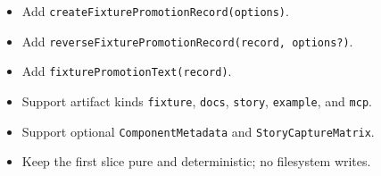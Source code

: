 \begin{itemize}
\tightlist
\item
  Add \texttt{c\allowbreak{}r\allowbreak{}e\allowbreak{}a\allowbreak{}t\allowbreak{}e\allowbreak{}F\allowbreak{}i\allowbreak{}x\allowbreak{}t\allowbreak{}u\allowbreak{}r\allowbreak{}e\allowbreak{}P\allowbreak{}r\allowbreak{}o\allowbreak{}m\allowbreak{}o\allowbreak{}t\allowbreak{}i\allowbreak{}o\allowbreak{}n\allowbreak{}R\allowbreak{}e\allowbreak{}c\allowbreak{}o\allowbreak{}r\allowbreak{}d\allowbreak{}(\allowbreak{}o\allowbreak{}p\allowbreak{}t\allowbreak{}i\allowbreak{}o\allowbreak{}n\allowbreak{}s\allowbreak{})}.
\item
  Add \texttt{r\allowbreak{}e\allowbreak{}v\allowbreak{}e\allowbreak{}r\allowbreak{}s\allowbreak{}e\allowbreak{}F\allowbreak{}i\allowbreak{}x\allowbreak{}t\allowbreak{}u\allowbreak{}r\allowbreak{}e\allowbreak{}P\allowbreak{}r\allowbreak{}o\allowbreak{}m\allowbreak{}o\allowbreak{}t\allowbreak{}i\allowbreak{}o\allowbreak{}n\allowbreak{}R\allowbreak{}e\allowbreak{}c\allowbreak{}o\allowbreak{}r\allowbreak{}d\allowbreak{}(\allowbreak{}r\allowbreak{}e\allowbreak{}c\allowbreak{}o\allowbreak{}r\allowbreak{}d\allowbreak{},\allowbreak{} \allowbreak{}o\allowbreak{}p\allowbreak{}t\allowbreak{}i\allowbreak{}o\allowbreak{}n\allowbreak{}s\allowbreak{}?\allowbreak{})}.
\item
  Add \texttt{f\allowbreak{}i\allowbreak{}x\allowbreak{}t\allowbreak{}u\allowbreak{}r\allowbreak{}e\allowbreak{}P\allowbreak{}r\allowbreak{}o\allowbreak{}m\allowbreak{}o\allowbreak{}t\allowbreak{}i\allowbreak{}o\allowbreak{}n\allowbreak{}T\allowbreak{}e\allowbreak{}x\allowbreak{}t\allowbreak{}(\allowbreak{}r\allowbreak{}e\allowbreak{}c\allowbreak{}o\allowbreak{}r\allowbreak{}d\allowbreak{})}.
\item
  Support artifact kinds \texttt{f\allowbreak{}i\allowbreak{}x\allowbreak{}t\allowbreak{}u\allowbreak{}r\allowbreak{}e}, \texttt{d\allowbreak{}o\allowbreak{}c\allowbreak{}s}, \texttt{s\allowbreak{}t\allowbreak{}o\allowbreak{}r\allowbreak{}y}, \texttt{e\allowbreak{}x\allowbreak{}a\allowbreak{}m\allowbreak{}p\allowbreak{}l\allowbreak{}e}, and \texttt{m\allowbreak{}c\allowbreak{}p}.
\item
  Support optional \texttt{C\allowbreak{}o\allowbreak{}m\allowbreak{}p\allowbreak{}o\allowbreak{}n\allowbreak{}e\allowbreak{}n\allowbreak{}t\allowbreak{}M\allowbreak{}e\allowbreak{}t\allowbreak{}a\allowbreak{}d\allowbreak{}a\allowbreak{}t\allowbreak{}a} and \texttt{S\allowbreak{}t\allowbreak{}o\allowbreak{}r\allowbreak{}y\allowbreak{}C\allowbreak{}a\allowbreak{}p\allowbreak{}t\allowbreak{}u\allowbreak{}r\allowbreak{}e\allowbreak{}M\allowbreak{}a\allowbreak{}t\allowbreak{}r\allowbreak{}i\allowbreak{}x}.
\item
  Keep the first slice pure and deterministic; no filesystem writes.
\end{itemize}

